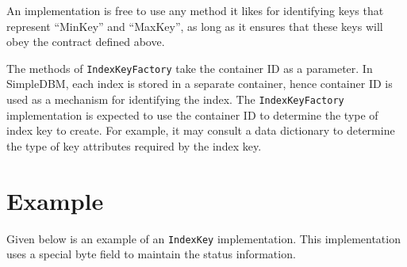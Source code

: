 \documentclass[a4paper,draft,oneside]{book}
\begin{document}
An implementation is free to use any method it likes for identifying
keys that represent ``MinKey'' and ``MaxKey'', as long as it ensures
that these keys will obey the contract defined above.

The methods of \verb|IndexKeyFactory| take the container ID as a
parameter. In SimpleDBM, each index is stored in a separate container,
hence container ID is used as a mechanism for identifying the index.
The \verb|IndexKeyFactory| implementation is expected to use the
container ID to determine the type of index key to create. For
example, it may consult a data dictionary to determine the type of key
attributes required by the index key.

\section{Example}

Given below is an example of an \verb|IndexKey| implementation. This
implementation uses a special byte field to maintain the status
information.
\end{document}
